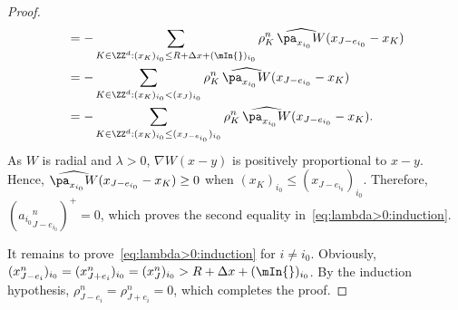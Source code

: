 \begin{proof}
\begin{equation*}
\begin{split}
&= -\sum_{K\in \ZZ^d : (x_{K})_{i_{0}} \le R + \Delta x + (\mIn{})_{i_{0}}}
\rho_{K}^n \, \widehat{\pa_{x_{i_{0}}} W}(x_{J-e_{i_{0}}}-x_K )
\\
&= -\sum_{K\in \ZZ^d : (x_{K})_{i_{0}} < (x_{J})_{i_{0}}} \rho_{K}^n \, \widehat{\pa_{x_{i_{0}}} W}(x_{J-e_{i_{0}}}-x_K )
\\
&= -\sum_{K\in \ZZ^d : (x_{K})_{i_{0}} \leq (x_{J-e_{i_{0}}})_{i_{0}}} \rho_{K}^n \, \widehat{\pa_{x_{i_{0}}} W}(x_{J-e_{i_{0}}}-x_K ).
\end{split}
\end{equation*}
As $W$ is radial and $\lambda >0$, $\nabla W(x - y)$ is positively proportional to $x-y$. Hence, $\widehat{\pa_{x_{i_{0}}} W}(x_{J-e_{i_{0}}}-x_K) \geq 0$ when $(x_{K})_{i_{0}} \leq (x_{J-e_{i_{0}}})_{i_{0}}$. Therefore, $({a_{i_{0}}}^n_{J-e_{i_{0}}})^{+}=0$, which proves the second equality in~\eqref{eq:lambda>0:induction}.

It remains to prove~\eqref{eq:lambda>0:induction} for $i \not = i_{0}$. Obviously, $(x^n_{J-e_{i}})_{i_{0}}= (x^n_{J+e_{i}})_{i_{0}} = (x^n_{J})_{i_{0}} > R + \Delta x + (\mIn{})_{i_{0}}$. By the induction hypothesis, $\rho^n_{J-e_{i}} =
\rho^n_{J+e_{i}} = 0$, which completes the proof.
\end{proof}

